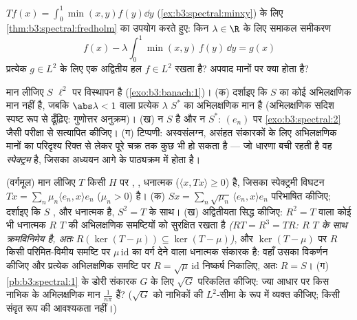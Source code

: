 \begin{exercise}[$\star\star$]\label{exo:b3:spectral:9}
$Tf(x) =
\int_0^1\min(x,y)f(y)\dd y$ (\cref{ex:b3:spectral:minxy}) के लिए \cref{thm:b3:spectral:fredholm} का उपयोग करते हुए: किन $\lambda \in \R$ के लिए
समाकल समीकरण
\[
f(x) - \lambda\int_0^1\min(x,y)\,f(y)\,\dd y = g(x)
\]
प्रत्येक $g \in L^2$ के लिए एक अद्वितीय हल $f \in L^2$ रखता है? अपवाद मानों
पर क्या होता है?
\end{exercise}

\begin{exercise}[$\star\star\star$]\label{exo:b3:spectral:10}
मान लीजिए $S$ $\ell^2$ पर विस्थापन है (\cref{exo:b3:banach:1})।
(क) दर्शाइए कि $S$ का कोई अभिलक्षणिक मान नहीं है, जबकि $\abs\lambda < 1$
वाला प्रत्येक $\lambda$ $S^*$ का अभिलक्षणिक मान है (अभिलक्षणिक सदिश
स्पष्ट रूप से ढूँढ़िए: गुणोत्तर अनुक्रम)।
(ख) न $S$  है और न $S^*$: $(e_n)$ पर \cref{exo:b3:spectral:2} जैसी परीक्षा से
सत्यापित कीजिए।
(ग) टिप्पणी: अस्वसंलग्न, असंहत संकारकों के लिए अभिलक्षणिक मानों का
परिदृश्य रिक्त से लेकर पूरे चक्र तक कुछ भी हो सकता है --- जो धारणा
बची रहती है वह \emph{स्पेक्ट्रम} है, जिसका अध्ययन आगे के
पाठ्यक्रम में होता है।
\end{exercise}

\begin{exercise}[$\star\star$]\label{exo:b3:spectral:11}
(वर्गमूल) मान लीजिए $T$ किसी  $H$ पर ,
, धनात्मक ($\langle x, Tx\rangle \geq 0$) है, जिसका स्पेक्ट्रमी विघटन $Tx = \sum_n\mu_n\langle e_n,
x\rangle e_n$
($\mu_n > 0$) है।
(क) $Sx = \sum_n\sqrt{\mu_n}\,\langle e_n, x\rangle
e_n$ परिभाषित कीजिए; दर्शाइए कि $S$ ,  और
धनात्मक है, $S^2
= T$ के साथ।
(ख) अद्वितीयता सिद्ध कीजिए: $R^2 = T$ वाला कोई भी  धनात्मक
 $R$ $T$ की अभिलक्षणिक समष्टियों को सुरक्षित रखता है
\emph{($RT = R^3 = TR$: $R$ $T$ के साथ क्रमविनिमेय है, अतः $R(\ker(T - \mu)) \subseteq \ker(T - \mu)$)}, और
$\ker(T - \mu)$ पर $R$ किसी परिमित-विमीय समष्टि पर $\mu\,\mathrm{id}$ का वर्ग देने वाला
धनात्मक संकारक है: वहाँ उसका विकर्णन कीजिए और प्रत्येक अभिलक्षणिक
समष्टि पर $R =
\sqrt\mu\,\mathrm{id}$ निष्कर्ष निकालिए, अतः $R = S$।
(ग) \cref{pb:b3:spectral:1} के डोरी संकारक $G$ के लिए $\sqrt G$ परिकलित कीजिए: ज्या
आधार पर किस नाभिक के अभिलक्षणिक मान $\frac1{n\pi}$ हैं? ($\sqrt G$ को नाभिकों
की $L^2$-सीमा के रूप में व्यक्त कीजिए; किसी संवृत रूप की आवश्यकता
नहीं।)
\end{exercise}

